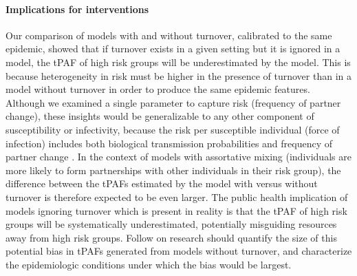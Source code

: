 \paragraph{Implications for interventions}
Our comparison of models with and without turnover,
calibrated to the same epidemic,
showed that if turnover exists in a given setting
but it is ignored in a model,
the tPAF of high risk groups will be underestimated by the model.
This is because heterogeneity in risk
must be higher in the presence of turnover than in a model without turnover
in order to produce the same epidemic features.
Although we examined a single parameter to capture risk (frequency of partner change),
these insights would be generalizable to
any other component of susceptibility or infectivity,
because the risk per susceptible individual (force of infection) includes both
biological transmission probabilities and frequency of partner change \citep{Anderson1991}.
In the context of models with assortative mixing
(individuals are more likely to form partnerships with
other individuals in their risk group),
the difference between the tPAFs estimated by the model
with versus without turnover is therefore expected to be even larger.
The public health implication of models ignoring turnover
which is present in reality is that
the tPAF of high risk groups will be systematically underestimated,
potentially misguiding resources away from high risk groups.
Follow on research should quantify the size of
this potential bias in tPAFs generated from models without turnover,
and characterize the epidemiologic conditions under which the bias would be largest.
